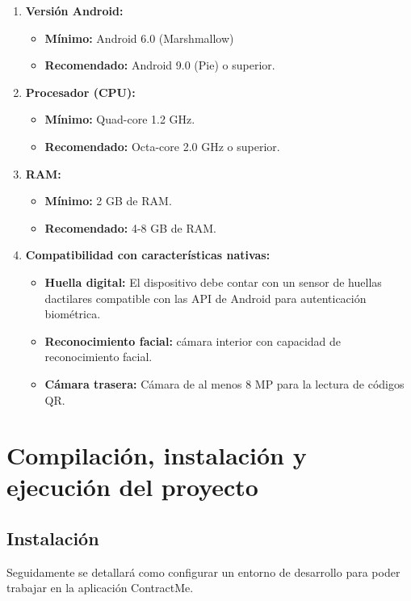 \begin{enumerate}

\item\textbf{Versión Android:}
	\begin{itemize}
	\item\textbf{Mínimo:}  Android 6.0 (Marshmallow)
	\item\textbf{Recomendado:} Android 9.0 (Pie) o superior.
	\end{itemize}
	
\item\textbf{Procesador (CPU):}
	\begin{itemize}
	\item\textbf{Mínimo:} Quad-core 1.2 GHz.
	\item\textbf{Recomendado:} Octa-core 2.0 GHz o superior.
	\end{itemize}
	
\item\textbf{RAM:}
	\begin{itemize}
	\item\textbf{Mínimo:} 2 GB de RAM.
	\item\textbf{Recomendado:} 4-8 GB de RAM.
	\end{itemize}
	
\item\textbf{Compatibilidad con características nativas:}
	\begin{itemize}
	\item\textbf{Huella digital:} El dispositivo debe contar con un sensor de huellas dactilares compatible con
	las API de Android para autenticación biométrica.
	\item\textbf{Reconocimiento facial:} cámara interior con capacidad de reconocimiento facial.
	\item\textbf{Cámara trasera:} Cámara de al menos 8 MP para la lectura de códigos QR.
	\end{itemize}

\end{enumerate}


\section{Compilación, instalación y ejecución del proyecto}

\subsection{Instalación}

Seguidamente se detallará como configurar un entorno de desarrollo para poder trabajar en la aplicación ContractMe.

